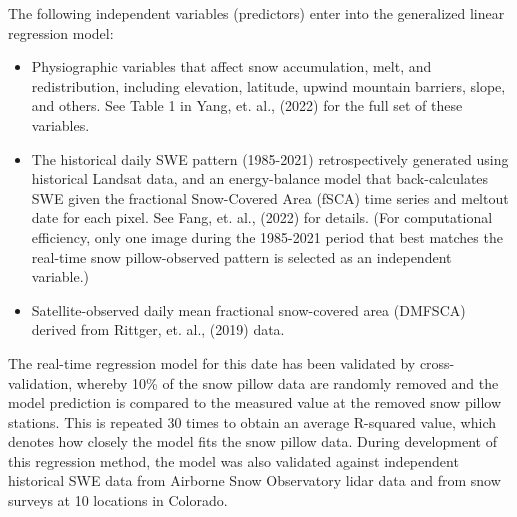 \documentclass{article}
\begin{document}
\noindent The following independent variables (predictors) enter into the generalized linear regression model:
\begin{itemize}[label=-]
    \item Physiographic variables that affect snow accumulation, melt, and redistribution, including elevation, latitude, upwind mountain barriers, slope, and others. See Table 1 in Yang, et. al., (2022) for the full set of these variables.
    \item The historical daily SWE pattern (1985-2021) retrospectively generated using historical Landsat data, and an energy-balance model that back-calculates SWE given the fractional Snow-Covered Area (fSCA) time series and meltout date for each pixel. See Fang, et. al., (2022) for details. (For computational efficiency, only one image during the 1985-2021 period that best matches the real-time snow pillow-observed pattern is selected as an independent variable.)
    \item Satellite-observed daily mean fractional snow-covered area (DMFSCA) derived from Rittger, et. al., (2019) data.
\end{itemize}

\noindent The real-time regression model for this date has been validated by cross-validation, whereby 10\% of the snow pillow data are randomly removed and the model prediction is compared to the measured value at the removed snow pillow stations. This is repeated 30 times to obtain an average R-squared value, which denotes how closely the model fits the snow pillow data. During development of this regression method, the model was also validated against independent historical SWE data from Airborne Snow Observatory lidar data and from snow surveys at 10 locations in Colorado.\\
\end{document}
